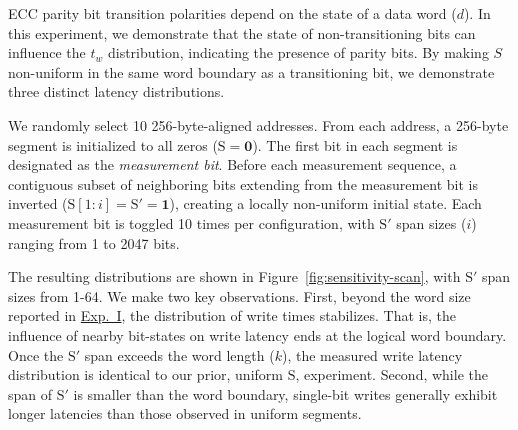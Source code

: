 


\label{exp:iii}

% 

ECC parity bit transition polarities depend on the state of a data word ($d$). In this experiment, we demonstrate that the state of non-transitioning bits can influence the $t_w$ distribution, indicating the presence of parity bits. By making $S$ non-uniform in the same word boundary as a transitioning bit, we demonstrate three distinct latency distributions. 

We randomly select 10 256-byte-aligned addresses. From each address, a 256-byte segment is initialized to all zeros ($\mathrm{S}=\mathbf{0}$).  
The first bit in each segment is designated as the \emph{measurement bit}.  
Before each measurement sequence, a contiguous subset of neighboring bits extending from the measurement bit is inverted ($\mathrm{S}[1:i] = \mathrm{S}' = \mathbf{1}$), creating a locally non-uniform initial state.  
Each measurement bit is toggled 10 times per configuration, with $\mathrm{S}'$ span sizes ($i$) ranging from 1 to 2047 bits.



The resulting distributions are shown in Figure~\ref{fig:sensitivity-scan}, with $\mathrm{S}'$ span sizes from 1-64. We make two key observations. First, beyond the word size reported in \hyperref[exp:i]{Exp.~I}, the distribution of write times stabilizes.
That is, the influence of nearby bit-states on write latency ends at the logical word boundary.  
Once the $\mathrm{S}'$ span exceeds the word length ($k$), the measured write latency distribution is identical to our prior, uniform $\mathrm{S}$, experiment.
Second, while the span of $\mathrm{S}'$ is smaller than the word boundary, single-bit writes generally exhibit longer latencies than those observed in uniform segments.



